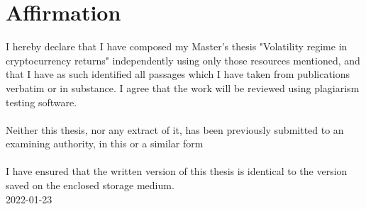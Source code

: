 \documentclass[12pt,a4paper]{article}
\begin{document}

\section*{Affirmation}
I hereby declare that I have composed my Master's thesis "Volatility regime in cryptocurrency returns" independently using only those resources mentioned, and that I have as such identified all passages which I have taken from publications verbatim or in substance. I agree that the work will be reviewed using plagiarism testing software.
\\~\\
Neither this thesis, nor any extract of it, has been previously submitted to an examining authority, in this or a similar form
\\~\\
I have ensured that the written version of this thesis is identical to the version saved on the enclosed storage medium.
\\[2in]
2022-01-23
\end{document}
